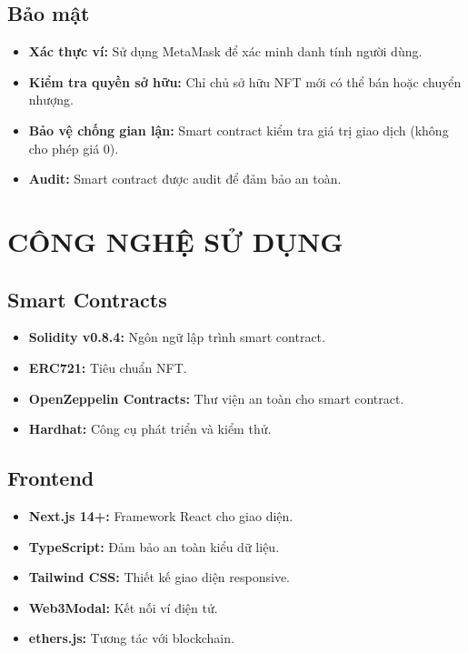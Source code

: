 \documentclass[a4paper,12pt]{report}
\begin{document}
\section{Bảo mật}
\begin{itemize}
    \item \textbf{Xác thực ví:} Sử dụng MetaMask để xác minh danh tính người dùng.
    \item \textbf{Kiểm tra quyền sở hữu:} Chỉ chủ sở hữu NFT mới có thể bán hoặc chuyển nhượng.
    \item \textbf{Bảo vệ chống gian lận:} Smart contract kiểm tra giá trị giao dịch (không cho phép giá 0).
    \item \textbf{Audit:} Smart contract được audit để đảm bảo an toàn.
\end{itemize}

\chapter{CÔNG NGHỆ SỬ DỤNG}

\section{Smart Contracts}
\begin{itemize}
    \item \textbf{Solidity v0.8.4:} Ngôn ngữ lập trình smart contract.
    \item \textbf{ERC721:} Tiêu chuẩn NFT.
    \item \textbf{OpenZeppelin Contracts:} Thư viện an toàn cho smart contract.
    \item \textbf{Hardhat:} Công cụ phát triển và kiểm thử.
\end{itemize}

\section{Frontend}
\begin{itemize}
    \item \textbf{Next.js 14+:} Framework React cho giao diện.
    \item \textbf{TypeScript:} Đảm bảo an toàn kiểu dữ liệu.
    \item \textbf{Tailwind CSS:} Thiết kế giao diện responsive.
    \item \textbf{Web3Modal:} Kết nối ví điện tử.
    \item \textbf{ethers.js:} Tương tác với blockchain.
\end{itemize}
\end{document}

